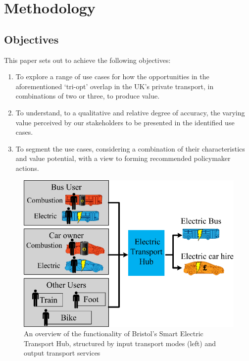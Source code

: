 \documentclass[journal]{IEEEtran}
\begin{document}
\section{Methodology}\label{methodology}

\subsection{Objectives}

This paper sets out to achieve the following objectives:

\begin{enumerate}
\item To explore a range of use cases for how the opportunities in the
  aforementioned `tri-opt' overlap in the UK's private transport, in
  combinations of two or three, to produce value.  
\item To understand, to a qualitative and relative degree of accuracy,
  the varying value perceived by our stakeholders to be presented in
  the identified use cases. 
\item To segment the use cases, considering a combination of their
  characteristics and value potential, with a view to forming
  recommended policymaker actions.
\end{enumerate}

\begin{figure}[!htb]
\centering
\includegraphics[width=\columnwidth]{images/bristolhub.png}
\caption{An overview of the functionality of Bristol's Smart Electric
  Transport Hub, structured by input transport modes (left) and output
  transport services}
\label{fig:bristolhub}
\end{figure}
\end{document}
